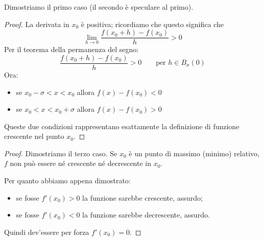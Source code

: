Dimostriamo il primo caso (il secondo è speculare al primo).
\begin{proof}
La derivata in $x_0$ è positiva; ricordiamo che questo significa che
\begin{equation*}
\lim_{h \to 0} \frac{f(x_0+h)-f(x_0)}{h} > 0
\end{equation*}
Per il teorema della permanenza del segno:
\begin{equation*}
\frac{f(x_0+h)-f(x_0)}{h} > 0 \qquad \text{per } h \in B_\sigma (0)
\end{equation*}
Ora:
\begin{itemize}
\item se $x_0 - \sigma < x < x_0$ allora $f(x) - f(x_0) < 0$
\item se $x_0 < x < x_0 + \sigma$ allora $f(x) - f(x_0) > 0$
\end{itemize}
Queste due condizioni rappresentano esattamente la definizione di funzione crescente nel punto $x_0$.
\end{proof}

\begin{proof}
Dimostriamo il terzo caso. Se $x_0$ è un punto di massimo (minimo) relativo, $f$ non può essere né crescente né decrescente in $x_0$.

Per quanto abbiamo appena dimostrato:
\begin{itemize}
\item se fosse $f'(x_0) > 0$ la funzione sarebbe crescente, assurdo;
\item se fosse $f'(x_0) < 0$ la funzione sarebbe decrescente, assurdo.
\end{itemize}

Quindi dev'essere per forza $f'(x_0) = 0$.
\end{proof}